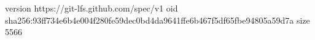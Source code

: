 version https://git-lfs.github.com/spec/v1
oid sha256:93ff734e6b4e004f280fe59dec0bd4da9641ffe6b467f5df65fbe94805a59d7a
size 5566
